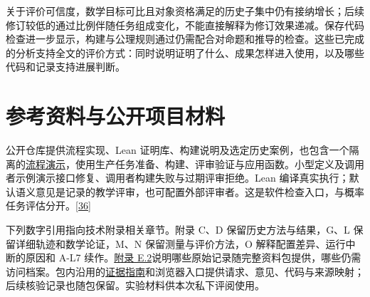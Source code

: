 关于评价可信度，数学目标可比且对象资格满足的历史子集中仍有接纳增长；后续修订较低的通过比例伴随任务组成变化，不能直接解释为修订效果递减。保存代码检查进一步显示，构建与公理规则通过仍需配合对命题和推导的检查。这些已完成的分析支持全文的评价方式：同时说明证明了什么、成果怎样进入使用，以及哪些代码和记录支持进展判断。

\section[参考资料与公开项目材料]{\texorpdfstring{\protect\hypertarget{section-7}{}参考资料与公开项目材料}{参考资料与公开项目材料}}
公开仓库提供流程实现、Lean 证明库、构建说明及选定历史案例，也包含一个隔离的\href{https://github.com/Kind-NK-Hill/ProbabilityTheoryFormalization/blob/d07f272850899b58612adf1c7dc202538503252f/docs/workflow_demo.md}{流程演示}，使用生产任务准备、构建、评审验证与应用函数。小型定义及调用者示例演示接口修复、调用者构建失败与过期评审拒绝。Lean 编译真实执行；默认语义意见是记录的教学评审，也可配置外部评审者。这是软件检查入口，与概率任务评估分开。\hyperlink{ref-36}{\mbox{[36]}}

下列数字引用指向技术附录相关章节。附录 C、D 保留历史方法与结果，G、L 保留详细轨迹和数学论证，M、N 保留测量与评价方法，O 解释配置差异、运行中断的原因和 A-L7 续作。\href{zh-appendix.pdf\#e2}{附录 E.2}说明哪些原始记录随完整资料包提供，哪些仍需访问档案。包内沿用的\href{EVIDENCE_GUIDE.pdf}{证据指南}和浏览器入口提供请求、意见、代码与来源映射；后续核验记录也随包保留。实验材料供本次私下评阅使用。


